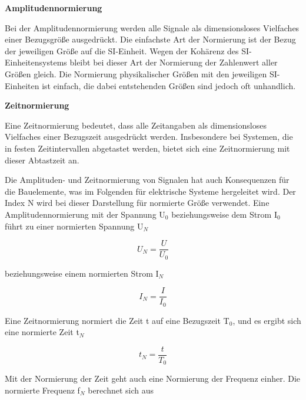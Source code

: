 \bigskip

{\selectfont
\noindent\textbf{Amplitudennormierung}} \smallskip

\noindent Bei der Amplitudennormierung werden alle Signale als dimensionsloses Vielfaches einer Bezugsgrö{\ss}e ausgedrückt. Die einfachste Art der Normierung ist der Bezug der jeweiligen Grö{\ss}e auf die SI-Einheit. Wegen der Kohärenz des SI-Einheitensystems bleibt bei dieser Art der Normierung der Zahlenwert aller Grö{\ss}en gleich. Die Normierung physikalischer Grö{\ss}en mit den jeweiligen SI-Einheiten ist einfach, die dabei entstehenden Grö{\ss}en sind jedoch oft unhandlich. 

\bigskip

{\selectfont
\noindent\textbf{Zeitnormierung}} \smallskip

\noindent Eine Zeitnormierung bedeutet, dass alle Zeitangaben als dimensionsloses Vielfaches einer Bezugszeit ausgedr\"{u}ckt werden. Insbesondere bei Systemen, die in festen Zeitintervallen abgetastet werden, bietet sich eine Zeitnormierung mit dieser Abtastzeit an. 

\noindent Die Amplituden- und Zeitnormierung von Signalen hat auch Konsequenzen f\"{u}r die Bauelemente, was im Folgenden f\"{u}r elektrische Systeme hergeleitet wird. Der Index N wird bei dieser Darstellung f\"{u}r normierte Gr\"{o}{\ss}e verwendet. Eine Amplitudennormierung mit der Spannung U${}_{0}$ beziehungsweise dem Strom I${}_{0}$ f\"{u}hrt zu einer normierten Spannung U${}_{N}$ 


\begin{equation}\label{eq:oneninetyeight}
U_{N} =\dfrac{U}{U_{0} }
\end{equation}

\noindent beziehungsweise einem normierten Strom I${}_{N}$

\begin{equation}\label{eq:oneninetynine}
I_{N} =\dfrac{I}{I_{0} }
\end{equation}


\noindent Eine Zeitnormierung normiert die Zeit t auf eine Bezugszeit T${}_{0}$, und es ergibt sich eine normierte Zeit t${}_{N}$

\begin{equation}\label{eq:onehundred}
t_{N} =\dfrac{t}{T_{0} }
\end{equation}


\noindent Mit der Normierung der Zeit geht auch eine Normierung der Frequenz einher. Die normierte Frequenz f${}_{N}$ berechnet sich aus

